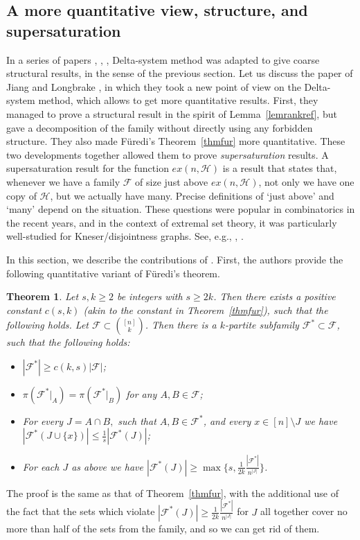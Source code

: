 \documentclass[graybox]{svmult}
\renewcommand{\le}{\leqslant}
\renewcommand{\ge}{\geqslant}
\newcommand{\ff}{\mathcal{F}}
\newcommand{\m}{\mathcal}
\newtheorem{thm}{Theorem}
\begin{document}
\subsection{A more quantitative view, structure, and supersaturation}\label{sec62}
In a series of papers \cite{Fu14}, \cite{FJ15}, \cite{JL}, Delta-system method was adapted to give coarse structural results, in the sense of the previous section. Let us discuss the paper of Jiang and Longbrake \cite{JL}, in which they took a new  point of view on the Delta-system method, which allows to get more quantitative results.  First, they managed to prove a structural result in the spirit of Lemma~\ref{lemrankref}, but gave a decomposition of the family without directly using any forbidden structure. They also made F\"uredi's Theorem~\ref{thmfur} more quantitative. These two developments together allowed them to prove {\it supersaturation} results. A supersaturation result for the function $ex(n,\m H)$ is a result that states that, whenever we have a family $\ff$ of size just above $ex(n,\m H)$, not only we have one copy of $\m H$, but we actually have many. Precise definitions of `just above' and `many' depend on the situation. These questions were popular in combinatorics in the recent years, and in the context of extremal set theory, it was particularly well-studied for Kneser/disjointness graphs. See, e.g., \cite{BL}, \cite{DGS}.

In this section, we describe the contributions of \cite{JL}. First, the authors provide the following quantitative variant of F\"uredi's theorem.

\begin{thm}\label{thmfurjl}
  Let $s,k\ge 2$ be integers with $s\ge 2k$. Then there exists a positive constant $c(s,k)$ (akin to the constant in Theorem~\ref{thmfur}), such that the following holds. Let $\ff\subset {[n]\choose k}$. Then there is a $k$-partite subfamily $\ff^*\subset \ff$, such that the following holds:
  \begin{itemize}
    \item $|\ff^*|\ge c(k,s)|\ff|$;
    \item $\pi(\ff^*|_A) = \pi(\ff^*|_B)$ for any $A,B\in \ff$;
    \item For every $J = A\cap B,$ such that $A,B\in \ff^*$, and every $x\in [n]\setminus J$ we have $|\ff^*(J\cup \{x\})|\le \frac 1s |\ff^*(J)|$;
    \item For each $J$ as above we have $|\ff^*(J)|\ge \max \big\{s,\frac 1{2k}\frac {|\ff^*|}{n^{|J|}}\big\}$.
  \end{itemize}
\end{thm}
The proof is the same as that of Theorem~\ref{thmfur}, with the additional use of the fact that the sets which violate $|\ff^*(J)|\ge \frac 1{2k}\frac {|\ff^*|}{n^{|J|}}$ for $J$ all together  cover no more than half of the sets from the family, and so we can get rid of them.
\end{document}
